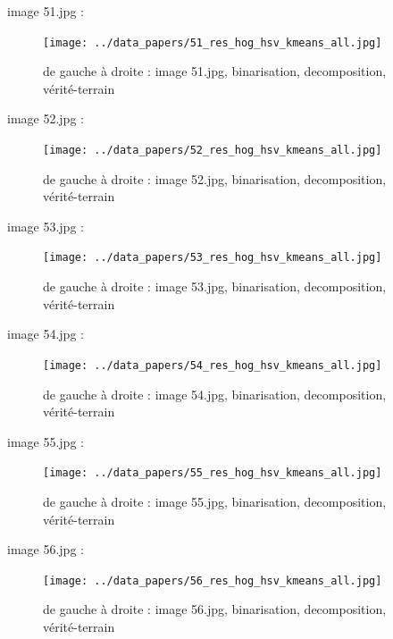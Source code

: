 \documentclass{book}
\begin{document}
image 51.jpg : 
\begin{figure}[H]
\begin{center}
\texttt{[image: ../data\_papers/51\_res\_hog\_hsv\_kmeans\_all.jpg]}
\end{center}
\caption{de gauche à droite : image 51.jpg, binarisation, decomposition, vérité-terrain}
\label{51}
\end{figure}
\clearpage


image 52.jpg : 
\begin{figure}[H]
\begin{center}
\texttt{[image: ../data\_papers/52\_res\_hog\_hsv\_kmeans\_all.jpg]}
\end{center}
\caption{de gauche à droite : image 52.jpg, binarisation, decomposition, vérité-terrain}
\label{52}
\end{figure}
\clearpage


image 53.jpg : 
\begin{figure}[H]
\begin{center}
\texttt{[image: ../data\_papers/53\_res\_hog\_hsv\_kmeans\_all.jpg]}
\end{center}
\caption{de gauche à droite : image 53.jpg, binarisation, decomposition, vérité-terrain}
\label{53}
\end{figure}
\clearpage


image 54.jpg : 
\begin{figure}[H]
\begin{center}
\texttt{[image: ../data\_papers/54\_res\_hog\_hsv\_kmeans\_all.jpg]}
\end{center}
\caption{de gauche à droite : image 54.jpg, binarisation, decomposition, vérité-terrain}
\label{54}
\end{figure}
\clearpage


image 55.jpg : 
\begin{figure}[H]
\begin{center}
\texttt{[image: ../data\_papers/55\_res\_hog\_hsv\_kmeans\_all.jpg]}
\end{center}
\caption{de gauche à droite : image 55.jpg, binarisation, decomposition, vérité-terrain}
\label{55}
\end{figure}
\clearpage


image 56.jpg : 
\begin{figure}[H]
\begin{center}
\texttt{[image: ../data\_papers/56\_res\_hog\_hsv\_kmeans\_all.jpg]}
\end{center}
\caption{de gauche à droite : image 56.jpg, binarisation, decomposition, vérité-terrain}
\label{56}
\end{figure}
\clearpage
\end{document}

